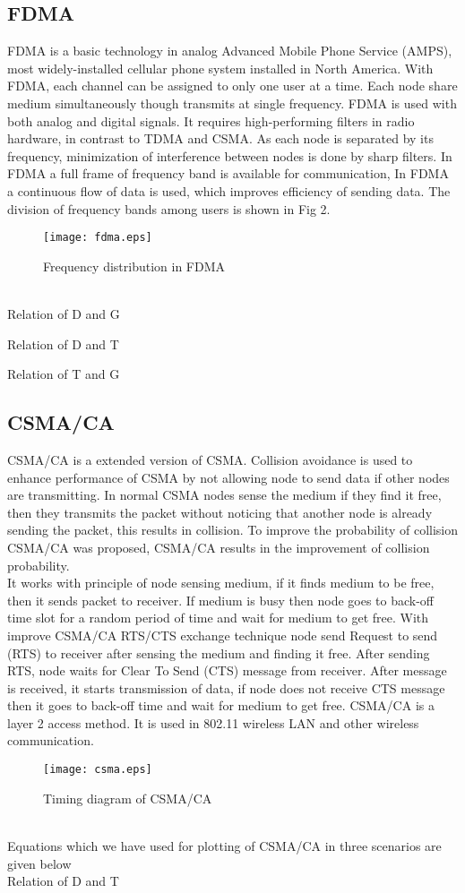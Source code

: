 \documentclass[10pt, conference, compsocconf]{IEEEtran}
\begin{document}
\subsection{FDMA}
FDMA is a basic technology in analog Advanced Mobile Phone Service (AMPS), most widely-installed cellular phone system installed in North America. With FDMA, each channel can be assigned to only one user at a time.
Each node share medium simultaneously though transmits at single frequency. FDMA is used with both analog and digital signals. It requires high-performing filters in radio hardware, in contrast to TDMA and CSMA. As each node is separated by its frequency, minimization of interference between nodes is done by sharp filters. In FDMA a full frame of frequency band is available for communication, In FDMA a continuous flow of data is used, which improves efficiency of sending data. The division of frequency bands among users is shown in Fig 2.
\begin{figure}[!h]
\centering
\caption{Frequency distribution in FDMA}
\texttt{[image: fdma.eps]}
\end{figure}
\\Relation of D and G

Relation of D and T

Relation of T and G

\subsection{CSMA/CA}
CSMA/CA is a extended version of CSMA. Collision avoidance is used to enhance performance of CSMA by not allowing node to send data if other nodes are transmitting. In normal CSMA nodes sense the medium if they find it free, then they transmits the packet without noticing that another node is already sending the packet, this results in collision. To improve the probability of collision CSMA/CA was proposed, CSMA/CA results in the improvement of collision probability.\\
\indent It works with principle of node sensing medium, if it finds medium to be free, then it sends packet to receiver. If medium is busy then node goes to back-off time slot for a random period of time and wait for medium to get free. With improve CSMA/CA RTS/CTS exchange technique node send Request to send (RTS) to receiver after sensing the medium and finding it free. After sending RTS, node waits
for Clear To Send (CTS) message from receiver. After message is received, it starts transmission of data, if node does not receive CTS message
then it goes to back-off time and wait for medium to get free. CSMA/CA is a layer 2 access method.  It is used in 802.11 wireless LAN and other wireless communication.
\begin{figure}[!h]
\centering
\caption{Timing diagram of CSMA/CA}
\texttt{[image: csma.eps]}
\end{figure}
\\
Equations which we have used for plotting of CSMA/CA in three scenarios are given below
\\
Relation of D and T
\end{document}
